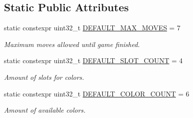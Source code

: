 \subsection*{Static Public Attributes}
\begin{DoxyCompactItemize}
\item 
static constexpr uint32\+\_\+t \hyperlink{classmastermind_1_1logic_1_1_mastermind_a1b389e8f4829939f8fd49e093cb9868b}{D\+E\+F\+A\+U\+L\+T\+\_\+\+M\+A\+X\+\_\+\+M\+O\+V\+ES} = 7
\begin{DoxyCompactList}\small\item\em Maximum moves allowed until game finished. \end{DoxyCompactList}\item 
static constexpr uint32\+\_\+t \hyperlink{classmastermind_1_1logic_1_1_mastermind_a27d7dbfa1b75744f4b8378e7faaec0af}{D\+E\+F\+A\+U\+L\+T\+\_\+\+S\+L\+O\+T\+\_\+\+C\+O\+U\+NT} = 4
\begin{DoxyCompactList}\small\item\em Amount of slots for colors. \end{DoxyCompactList}\item 
static constexpr uint32\+\_\+t \hyperlink{classmastermind_1_1logic_1_1_mastermind_a090907ffd34339289c533fada5bd05c6}{D\+E\+F\+A\+U\+L\+T\+\_\+\+C\+O\+L\+O\+R\+\_\+\+C\+O\+U\+NT} = 6
\begin{DoxyCompactList}\small\item\em Amount of available colors. \end{DoxyCompactList}\end{DoxyCompactItemize}
